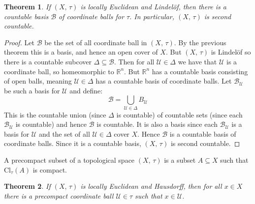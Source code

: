 \documentclass{article}
\theoremstyle{plain}
\newtheorem{theorem}{Theorem}[section]
\theoremstyle{normal}
\newenvironment{definition}{%
    \pushQED{\qed}\renewcommand{\qedsymbol}{$\blacksquare$}\definitionx%
}{%
    \popQED\enddefinitionx%
}
\begin{document}
        \begin{theorem}
            If $(X,\,\tau)$ is locally Euclidean and Lindel\"{o}f, then
            there is a countable basis $\mathcal{B}$ of coordinate balls for
            $\tau$. In particular, $(X,\,\tau)$ is second countable.
        \end{theorem}
        \begin{proof}
            Let $\mathcal{B}$ be the set of all coordinate ball in
            $(X,\,\tau)$. By the previous theorem this is a basis, and hence an
            open cover of $X$. But $(X,\,\tau)$ is Lindel\"{o}f so there is a
            countable subcover $\Delta\subseteq\mathcal{B}$. Then for all
            $\mathcal{U}\in\Delta$ we have that $\mathcal{U}$ is a coordinate
            ball, so homeomorphic to $\mathbb{R}^{n}$. But $\mathbb{R}^{n}$ has
            a countable basis consisting of open balls, meaning
            $\mathcal{U}\in\Delta$ has a countable basis of coordinate balls.
            Let $\mathcal{B}_{\mathcal{U}}$ be such a basis for $\mathcal{U}$
            and define:
            \begin{equation}
                \mathcal{B}=\bigcup_{\mathcal{U}\in\Delta}B_{\mathcal{U}}
            \end{equation}
            This is the countable union (since $\Delta$ is countable) of
            countable sets (since each $\mathcal{B}_{\mathcal{U}}$ is
            countable) and hence $\mathcal{B}$ is countable. It is also a
            basis since each $\mathcal{B}_{\mathcal{U}}$ is a basis for
            $\mathcal{U}$ and the set of all $\mathcal{U}\in\Delta$ cover
            $X$. Hence $\mathcal{B}$ is a countable basis of coordinate balls.
            Since it is a countable basis, $(X,\,\tau)$ is second countable.
        \end{proof}
        \begin{definition}[\textbf{Precompact}]
            A precompact subset of a topological space $(X,\,\tau)$ is a subset
            $A\subseteq{X}$ such that $\textrm{Cl}_{\tau}(A)$ is compact.
        \end{definition}
        \begin{theorem}
            If $(X,\,\tau)$ is locally Euclidean and Hausdorff, then for all
            $x\in{X}$ there is a precompact coordinate ball $\mathcal{U}\in\tau$
            such that $x\in\mathcal{U}$.
        \end{theorem}
\end{document}
